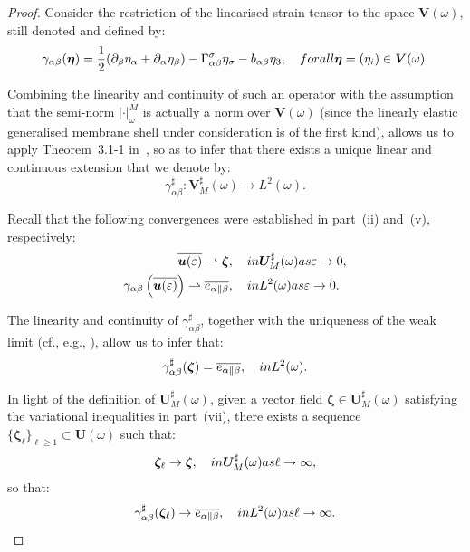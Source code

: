 \documentclass{amsart}
\begin{document}
\begin{proof}
Consider the restriction of the linearised strain tensor to the space $\bm{V}(\omega)$, still denoted and defined by:
\begin{equation*}
	\gamma_{\alpha\beta}(\bm{\eta})=\dfrac{1}{2}(\partial_\beta \eta_\alpha + \partial_\alpha \eta_\beta ) - \Gamma^\sigma_{\alpha\beta} \eta_\sigma - b_{\alpha\beta} \eta_3, \quad\textup{ for all }\bm{\eta}=(\eta_i)\in\bm{V}(\omega).
\end{equation*}

Combining the linearity and continuity of such an operator with the assumption that the semi-norm $|\cdot|_\omega^M$ is actually a norm over $\bm{V}(\omega)$ (since the linearly elastic generalised membrane shell under consideration is of the first kind), allows us to apply Theorem~3.1-1 in~\cite{Ciarlet2025}, so as to infer that there exists a unique linear and continuous extension that we denote by:
\begin{equation*}
	\gamma_{\alpha\beta}^{\sharp}:\bm{V}_M^\sharp(\omega) \to L^2(\omega).
\end{equation*}

Recall that the following convergences were established in part~(ii) and~(v), respectively:
\begin{equation*}
	\begin{aligned}
		\overline{\bm{u}(\varepsilon)} \rightharpoonup \bm{\zeta}&,\quad\textup{ in } \bm{U}_M^\sharp(\omega) \textup{ as }\varepsilon\to 0,\\
		\gamma_{\alpha\beta}\left(\overline{\bm{u}(\varepsilon)}\right) \rightharpoonup \overline{e_{\alpha\|\beta}}&,\quad\textup{ in }L^2(\omega) \textup{ as }\varepsilon\to 0.
	\end{aligned}
\end{equation*}

The linearity and continuity of $\gamma_{\alpha\beta}^{\sharp}$, together with the uniqueness of the weak limit (cf., e.g., \cite{Brez11}), allow us to infer that:
\begin{equation*}
	\gamma_{\alpha\beta}^{\sharp}(\bm{\zeta}) = \overline{e_{\alpha\|\beta}},\quad \textup{ in } L^2(\omega).
\end{equation*}

In light of the definition of $\bm{U}_M^\sharp(\omega)$, given a vector field $\bm{\zeta} \in \bm{U}_M^\sharp(\omega)$ satisfying the variational inequalities in part~(vii), there exists a sequence $\{\bm{\zeta}_\ell\}_{\ell\ge 1} \subset \bm{U}(\omega)$ such that:
\begin{equation*}
	\bm{\zeta}_\ell \to \bm{\zeta},\quad\textup{ in }\bm{U}_M^\sharp(\omega) \textup{ as }\ell\to\infty,
\end{equation*}
so that:
\begin{equation}
	\label{eq2}
	\gamma_{\alpha\beta}^{\sharp}(\bm{\zeta}_\ell) \to \overline{e_{\alpha\|\beta}},\quad\textup{ in }L^2(\omega) \textup{ as }\ell\to\infty.
\end{equation}


\end{proof}
\end{document}
